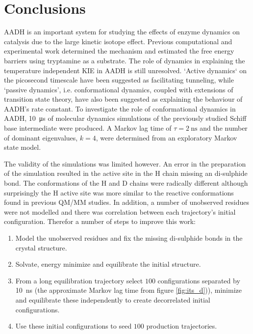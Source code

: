 \section{Conclusions}
AADH is an important system for studying the effects of enzyme dynamics on catalysis due to the large kinetic isotope effect. Previous computational and experimental work determined the mechanism and estimated the free energy barriers using tryptamine as a substrate. The role of dynamics in explaining the temperature independent KIE in AADH is still unresolved. `Active dynamics` on the picosecond timescale have been suggested as facilitating tunneling, while  `passive dynamics', i.e. conformational dynamics, coupled with extensions of transition state theory, have also been suggested as explaining the behaviour of AADH's rate constant. To investigate the role of conformational dynamics in AADH, \SI{10}{\micro\second} of molecular dynamics simulations of the previously studied Schiff base intermediate were produced. A Markov lag time of $\tau=\SI{2}{\nano\second}$ and the number of dominant eigenvalues, $k=4$, were determined from an exploratory Markov state model. 

The validity of the simulations was limited however. An error in the preparation of the simulation resulted in the active site in the H chain missing an di-sulphide bond. The conformations of the H and D chains were radically different although surprisingly the H active site was more similar to the reactive conformations found in previous QM/MM studies. In addition, a number of unobserved residues were not modelled and there was correlation between each trajectory's initial configuration. Therefor a number of steps to improve this work: 

\begin{enumerate}
    \item Model the unobserved residues and fix the missing di-sulphide bonds in the crystal structure. 
    \item Solvate, energy minimize and equilibrate the initial structure. 
    \item From a long equilibration trajectory select $100$ configurations separated by \SI{10}{\nano\second} (the approximate Markov lag time from figure \ref{fig:its_d})), minimize and equilibrate these independently to create decorrelated initial configurations.
    \item  Use these initial configurations to seed $100$ production trajectories.
\end{enumerate}


